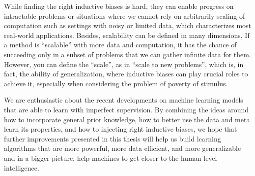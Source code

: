 While finding the right inductive biases is hard, they can enable progress on intractable problems or situations where we cannot rely on arbitrarily scaling of computation such as settings with noisy or limited data, which characterizes most real-world applications. 
Besides, scalability can be defined in many dimensions, If a method is ``scalable'' with more data and computation, it has the chance of succeeding only in a subset of problems that we can gather infinite data for them. 
However, you can define the ``scale'', as in ``scale to new problems'', which is, in fact, the ability of generalization, where inductive biases can play crucial roles to achieve it, especially when considering the problem of poverty of stimulus.


\bigskip
We are enthusiastic about the recent developments on machine learning models that are able to learn with imperfect supervision. 
By combining the ideas around how to incorporate general prior knowledge, how to better use the data and meta learn its properties, and how to injecting right inductive biases, we hope that further improvements presented in this thesis will help us build learning algorithms that are more powerful, more data efficient, and more generalizable and in a bigger picture, help machines to get closer to the human-level intelligence. 
